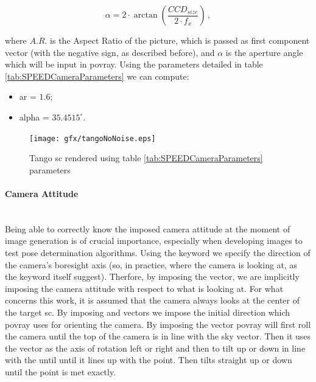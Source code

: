 \begin{equation}
  \alpha = 2 \cdot \arctan{\left( \frac{CCD_{size}}{2 \cdot f_x} \right)} \,,
\end{equation}

where $A.R.$ is the Aspect Ratio of the picture, which is passed as first component  vector (with the negative sign, as described before), and $\alpha$ is the aperture angle which will be input in \acrshort{povray}.
Using the parameters detailed in table \ref{tab:SPEEDCameraParameters} we can compute:
\begin{itemize}
  \item \gls{ar} = $1.6$;
  \item \gls{alpha} = $35.4515 ^{\circ}$.
\end{itemize}

\begin{figure}[htbp]
  \centering
  \texttt{[image: gfx/tangoNoNoise.eps]}
  \caption{Tango \acrshort{sc} rendered using table \ref{tab:SPEEDCameraParameters} parameters}
  \label{fig:tangoNoNoise}
\end{figure}

\paragraph{Camera Attitude}\mbox{}\\
Being able to correctly know the imposed camera attitude at the moment of image generation is of crucial importance, especially when developing images to test pose determination algorithms.
Using the  keyword we specify the direction of the camera's boresight axis (so, in practice, where the camera is looking at, as the keyword itself suggest). Therfore, by imposing the  vector, we are implicitly imposing the camera attitude with respect to what is looking at. For what concerns this work, it is assumed that the camera always looks at the center of the target \acrshort{sc}.
By imposing  and  vectors we impose the initial direction which \acrshort{povray} uses for orienting the camera.
By imposing the  vector \acrshort{povray} will first roll the camera until the top of the camera is in line with the sky vector. Then it uses the  vector as the axis of rotation left or right and then to tilt up or down in line with the  until until it lines up with the  point. Then tilts straight up or down until the  point is met exactly.

